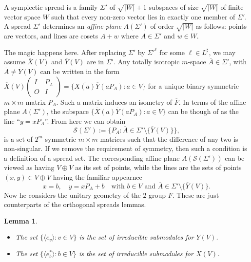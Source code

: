 \documentclass[a4paper]{article}
\newtheorem{lemma}{Lemma}
\begin{document}
  A symplectic spread is a family $\Sigma'$ of
  $\sqrt{|W|}+1$ subspaces of size $\sqrt{|W|}$ of finite
  vector space $W$ such that every non-zero vector lies in
  exactly one member of $\Sigma'$. A spread $\Sigma'$ 
  determines an \textit{affine plane} $A(\Sigma')$ of order
  $\sqrt{|W|}$ as follows: points are vectors, and lines are
  cosets $A+w$ where $A \in \Sigma'$ and $w \in W$.

  The magic happens here. After replacing $\Sigma'$ by
  $\Sigma'^{\ell}$ for some $\ell \in L^{\sharp}$, we may
  assume $\overline{X}(V)$ and $\overline{Y}(V)$ are in
  $\Sigma'$. Any totally isotropic $m$-space $\overline{A}
  \in \Sigma'$, with $\overline{A} \neq \overline{Y}(V)$ can
  be written in the form $\overline{X}(V) \begin{pmatrix} I
  & P_A \\ O & I\end{pmatrix} =
  \{\overline{X(a)}\overline{Y}(aP_A) : a \in V\}$ for a
  unique binary symmetric $m \times m$ matrix $P_A$. Such a
  matrix induces an isometry of $\overline{F}$. In terms of
  the affine plane $A(\Sigma')$, the subspace
  $\{\overline{X}(a)\overline{Y}(aP_A) : a \in V\}$ can be
  though of as the line ``$y = xP_A$''. From here we can
  obtain
   \begin{equation}
    \mathcal S(\Sigma')
    := \{P_A : \overline{A} \in \Sigma' \setminus
    \{\overline{Y}(V)\}\},
  \end{equation}
  is a set of $2^{m}$ symmetric $m \times m$ matrices such
  that the difference of any two is non-singular. If we
  remove the requirement of symmetry, then such a condition
  is a definition of a spread set. The corresponding affine
  plane $A(\mathcal S(\Sigma'))$ can be viewed as having $V
  \oplus V$ as its set of points, while the lines are the
  sets of points $(x,y) \in V \oplus V$ having the familiar
  appearnce
  \[
    x = b, \quad
    y = xP_A + b
    \quad
    \text{with }
    b \in V 
    \text{ and }
    \overline{A} \in \Sigma' \setminus \{\overline{Y}(V)\}.
  \] 
  Now he considers the unitary geometry of the $2$-group
  $F$. These are just counterparts of the orthogonal spreads
  lemmas.

  \begin{lemma}
    \begin{itemize}
      \item The set $\{\langle e_v \rangle : v \in V\}$ is
        the set of irreducible submodules for $Y(V)$.
      \item The set $\{\langle e_b^{*} \rangle : b \in V\}$ 
        is the set of irreducible submodules for $X(V)$.
    \end{itemize}
  \end{lemma}
\end{document}
